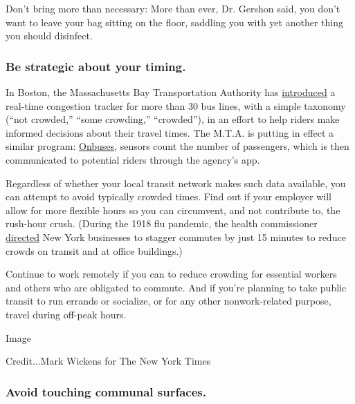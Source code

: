 Don't bring more than necessary: More than ever, Dr. Gershon said, you
don't want to leave your bag sitting on the floor, saddling you with yet
another thing you should disinfect.

\hypertarget{be-strategic-about-your-timing}{%
\subsubsection{Be strategic about your
timing.}\label{be-strategic-about-your-timing}}

In Boston, the Massachusetts Bay Transportation Authority has
\href{https://www.mbta.com/projects/crowding-information-riders}{introduced}
a real-time congestion tracker for more than 30 bus lines, with a simple
taxonomy (``not crowded,'' ``some crowding,'' ``crowded''), in an effort
to help riders make informed decisions about their travel times. The
M.T.A. is putting in effect a similar program:
\href{http://www.mta.info/press-release/nyc-transit/mta-announces-new-real-time-bus-ridership-tracker-web-and-app-0}{Onbuses},
sensors count the number of passengers, which is then communicated to
potential riders through the agency's app.

Regardless of whether your local transit network makes such data
available, you can attempt to avoid typically crowded times. Find out if
your employer will allow for more flexible hours so you can circumvent,
and not contribute to, the rush-hour crush. (During the 1918 flu
pandemic, the health commissioner
\href{https://www.reuters.com/article/us-health-coronavirus-usa-subway/as-in-1918-new-york-may-use-staggered-work-hours-to-keep-subway-safe-idUSKBN22W1D2}{directed}
New York businesses to stagger commutes by just 15 minutes to reduce
crowds on transit and at office buildings.)

Continue to work remotely if you can to reduce crowding for essential
workers and others who are obligated to commute. And if you're planning
to take public transit to run errands or socialize, or for any other
nonwork-related purpose, travel during off-peak hours.

Image

Credit...Mark Wickens for The New York Times

\hypertarget{avoid-touching-communal-surfaces}{%
\subsubsection{Avoid touching communal
surfaces.}\label{avoid-touching-communal-surfaces}}

